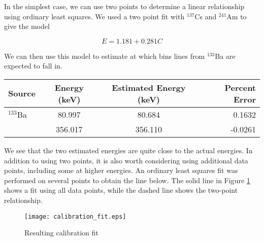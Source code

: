 In the simplest case, we can use two points to determine a linear relationship
using ordinary least squares. We used a two point fit with $^{137}$Cs and
$^{241}$Am to give the model

\begin{equation}
E = 1.181 + 0.281 C
\end{equation}

We can then use this model to estimate at which bins lines from $^{133}$Ba are
expected to fall in.

\begin{table}[H]
  \begin{center}
    \begin{tabular}{l|c|c|r}
      \textbf{Source} & \textbf{Energy (keV)} & \textbf{Estimated Energy (keV)} & \textbf{Percent Error}\\
      \hline
      $^{133}$Ba    &  80.997    & 80.684   &  0.1632 \\
                    &  356.017   & 356.110  &  -0.0261 \\
    \end{tabular}
  \end{center}
\end{table}

We see that the two estimated energies are quite close to the actual energies. In addition to using two points,
it is also worth considering using additional data points, including some at higher energies. An ordinary least
squares fit was performed on several points to obtain the line below. The solid line in Figure \ref{fig:fit} shows a fit using all data points,
while the dashed line shows the two-point relationship.

\begin{figure}[H]
\label{fig:fit}
\begin{center}
\texttt{[image: calibration\_fit.eps]}
\caption{Resulting calibration fit}
\end{center}
\end{figure}
